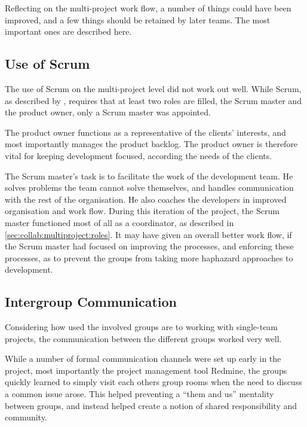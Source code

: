 Reflecting on the multi-project work flow, a number of things could have been improved, and a few things should be retained by later teams. 
The most important ones are described here.

\subsection{Use of Scrum}
\label{sec:eval:multiproject:scrum}
The use of Scrum on the multi-project level did not work out well. 
While Scrum, as described by \citet{scrumGuide}, requires that at least two roles are filled, the Scrum master and the product owner, only a Scrum master was appointed. 

The product owner functions as a representative of the clients' interests, and most importantly manages the product backlog. 
The product owner is therefore vital for keeping development focused, according the needs of the clients.

The Scrum master's task is to facilitate the work of the development team. 
He solves problems the team cannot solve themselves, and handles communication with the rest of the organisation. 
He also coaches the developers in improved organisation and work flow. 
During this iteration of the \giraf project, the Scrum master functioned most of all as a coordinator, as described in \cref{sec:collab:multiproject:roles}. 
It may have given an overall better work flow, if the Scrum master had focused on improving the processes, and enforcing these processes, as to prevent the groups from taking more haphazard approaches to development.

\subsection{Intergroup Communication}
Considering how used the involved groups are to working with single-team projects, the communication between the different groups worked very well. 

While a number of formal communication channels were set up early in the project, most importantly the project management tool Redmine, the groups quickly learned to simply visit each others group rooms when the need to discuss a common issue arose.
This helped preventing a ``them and us'' mentality between groups, and instead helped create a notion of shared responsibility and community. 
